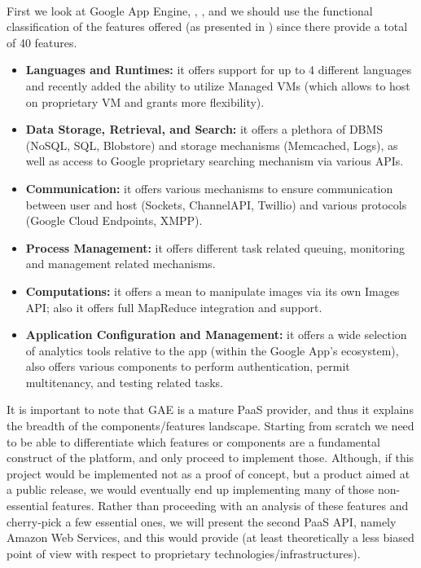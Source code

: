 \documentclass[11pt]{amsart}
\begin{document}
\begin{enumarate}
          \\ First we look at Google App Engine, \cite{gae_web},
          \cite{zahariev2009google}, and we should use the functional classification of
          the features offered (as presented in \cite{gae_web}) since there provide a
          total of 40 features. 
          \begin{itemize}
            \item \textbf{Languages and Runtimes:} it offers support for up to 4 different
              languages and recently added the ability to utilize Managed VMs (which
              allows to host on proprietary VM and grants more flexibility).
            \item \textbf{Data Storage, Retrieval, and Search:} it offers a plethora of
              DBMS (NoSQL, SQL, Blobstore) and storage mechanisms (Memcached, Logs), as
              well as access to Google proprietary searching mechanism via various APIs.
            \item \textbf{Communication:} it offers various mechanisms to ensure
              communication between user and host (Sockets, ChannelAPI, Twillio) and
              various protocols (Google Cloud Endpoints, XMPP).
            \item \textbf{Process Management:} it offers different task related queuing,
              monitoring and management related mechanisms.
            \item \textbf{Computations:} it offers a mean to manipulate images via its own
              Images API; also it offers full MapReduce integration and support.
            \item \textbf{Application Configuration and Management:} it offers a wide
              selection of analytics tools relative to the app (within the Google App's
              ecosystem), also offers various components to perform authentication,
              permit multitenancy, and testing related tasks.
          \end{itemize}
          It is important to note that GAE is a mature PaaS provider, and thus it explains
          the breadth of the components/features landscape. Starting from scratch we need
          to be able to differentiate which features or components are a fundamental
          construct of the platform, and only proceed to implement those. Although, if
          this project would be implemented not as a proof of concept, but a product aimed
          at a public release, we would eventually end up implementing many of those
          non-essential features. Rather than proceeding with an analysis of these
          features and cherry-pick a few essential ones, we will present the second PaaS
          API, namely Amazon Web Services, and this would provide (at least theoretically a
          less biased point of view with respect to proprietary technologies/infrastructures).
          

\end{enumarate}
\end{document}
